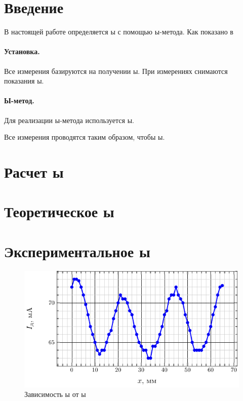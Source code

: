 \documentclass[a4paper,14pt]{extarticle}
\begin{document}


\tableofcontents
\newpage



\section*{Введение}

В настоящей работе определяется  ы
с помощью ы-метода.  Как показано в \cite[стр. ы]{met}

\paragraph{Установка.} 
Все измерения базируются на получении  ы.
При измерениях снимаются показания ы.

\paragraph{Ы-метод.} 
Для реализации ы-метода используется ы.

Все измерения проводятся таким образом, чтобы ы.

\newpage

\section{Расчет ы}


\section{Теоретическое ы}


\newpage
\section{Экспериментальное ы}

\begin{figure}[h!]
    \centering
    \includegraphics[scale=1.5]{fig/e2_from_x}
    \caption{Зависимость ы от  ы}
    \label{fig:exp:1}
\end{figure}
\end{document}
